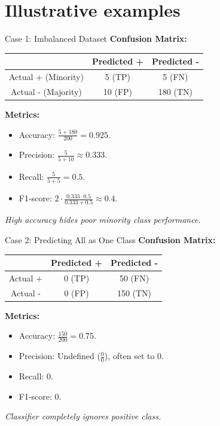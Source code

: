 \documentclass{beamer}
\begin{document}
\section{Illustrative examples}
\begin{frame}{Case 1: Imbalanced Dataset}
  \textbf{Confusion Matrix:}
  \begin{table}[h]
    \centering
    \begin{tabular}{|c|c|c|}
      \hline
      & Predicted + & Predicted - \\
      \hline
      Actual + (Minority) & 5 (TP) & 5 (FN) \\
      \hline
      Actual - (Majority) & 10 (FP) & 180 (TN) \\
      \hline
    \end{tabular}
  \end{table}
  \textbf{Metrics:}
  \begin{itemize}
    \item Accuracy: \( \frac{5 + 180}{200} = 0.925 \).
    \item Precision: \( \frac{5}{5 + 10} \approx 0.333 \).
    \item Recall: \( \frac{5}{5 + 5} = 0.5 \).
    \item F1-score: \( 2 \cdot \frac{0.333 \cdot 0.5}{0.333 + 0.5} \approx 0.4 \).
  \end{itemize}
  \textit{\small{High accuracy hides poor minority class performance.}}
\end{frame}

\begin{frame}{Case 2: Predicting All as One Class}
  \textbf{Confusion Matrix:}
  \begin{table}[h]
    \centering
    \begin{tabular}{|c|c|c|}
      \hline
      & Predicted + & Predicted - \\
      \hline
      Actual + & 0 (TP) & 50 (FN) \\
      \hline
      Actual - & 0 (FP) & 150 (TN) \\
      \hline
    \end{tabular}
  \end{table}
  \textbf{Metrics:}
  \begin{itemize}
    \item Accuracy: \( \frac{150}{200} = 0.75 \).
    \item Precision: Undefined (\( \frac{0}{0} \)), often set to 0.
    \item Recall: \( 0 \).
    \item F1-score: \( 0 \).
  \end{itemize}
  \textit{\small{Classifier completely ignores positive class.}}
\end{frame}
\end{document}
